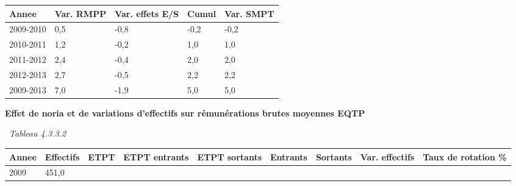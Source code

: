 \begin{longtable}[]{@{}lllll@{}}
\toprule
Annee & Var. RMPP & Var. effets E/S & Cumul & Var. SMPT\tabularnewline
\midrule
\endhead
2009-2010 & 0,5 & -0,8 & -0,2 & -0,2\tabularnewline
2010-2011 & 1,2 & -0,2 & 1,0 & 1,0\tabularnewline
2011-2012 & 2,4 & -0,4 & 2,0 & 2,0\tabularnewline
2012-2013 & 2,7 & -0,5 & 2,2 & 2,2\tabularnewline
2009-2013 & 7,0 & -1,9 & 5,0 & 5,0\tabularnewline
\bottomrule
\end{longtable}

\textbf{Effet de noria et de variations d'effectifs sur rémunérations
brutes moyennes EQTP}

~\emph{Tableau 4.3.3.2}

\begin{longtable}[]{@{}lllllllll@{}}
\toprule
\begin{minipage}[b]{0.05\columnwidth}\raggedright
Annee\strut
\end{minipage} & \begin{minipage}[b]{0.08\columnwidth}\raggedright
Effectifs\strut
\end{minipage} & \begin{minipage}[b]{0.05\columnwidth}\raggedright
ETPT\strut
\end{minipage} & \begin{minipage}[b]{0.10\columnwidth}\raggedright
ETPT entrants\strut
\end{minipage} & \begin{minipage}[b]{0.10\columnwidth}\raggedright
ETPT sortants\strut
\end{minipage} & \begin{minipage}[b]{0.07\columnwidth}\raggedright
Entrants\strut
\end{minipage} & \begin{minipage}[b]{0.07\columnwidth}\raggedright
Sortants\strut
\end{minipage} & \begin{minipage}[b]{0.11\columnwidth}\raggedright
Var. effectifs\strut
\end{minipage} & \begin{minipage}[b]{0.14\columnwidth}\raggedright
Taux de rotation \%\strut
\end{minipage}\tabularnewline
\midrule
\endhead
\begin{minipage}[t]{0.05\columnwidth}\raggedright
2009\strut
\end{minipage} & \begin{minipage}[t]{0.08\columnwidth}\raggedright
451,0\strut
\end{minipage} & \begin{minipage}[t]{0.05\columnwidth}\raggedright

\end{minipage}
\end{longtable}
